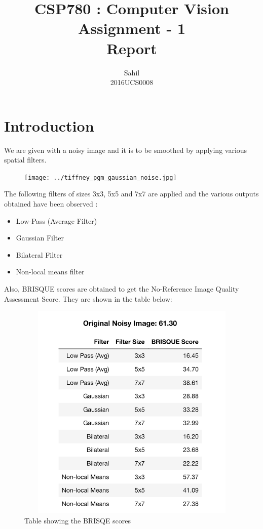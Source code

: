 \documentclass[]{article}
\title{\centering CSP780 : Computer Vision \\Assignment - 1\\Report}
\author{Sahil\\  2016UCS0008}
\begin{document}
	
	\maketitle	
	\section{Introduction}
	\large
	We are given with a noisy image and it is to be smoothed by applying various spatial filters.
	\begin{figure}[H]
		\centering
		\vspace{0pt}
		\texttt{[image: ../tiffney\_pgm\_gaussian\_noise.jpg]}
	\end{figure}
	
	The following filters of sizes 3x3, 5x5 and 7x7 are applied and the various outputs obtained have been observed : \\
	\begin{itemize}
		\item Low-Pass (Average Filter)
		\item Gaussian Filter
		\item Bilateral Filter
		\item Non-local means filter
	\end{itemize}
 	Also, BRISQUE scores are obtained to get the No-Reference Image Quality Assessment Score. They are shown in the table below:
 	
 	\begin{figure}[H]       
 			\centering
 			\includegraphics[width=800pt, height = 300pt, keepaspectratio]{./brisque_scores.png}  
 			\caption{Table showing the BRISQE scores}
 	\end{figure}
 	
\end{document}
